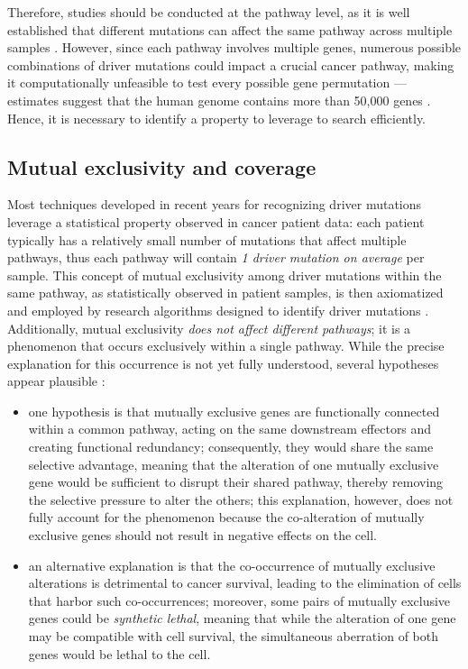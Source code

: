 Therefore, studies should be conducted at the pathway level, as it is well established that different mutations can affect the same pathway across multiple samples \cite{multi-dendrix}. However, since each pathway involves multiple genes, numerous possible combinations of driver mutations could impact a crucial cancer pathway, making it computationally unfeasible to test every possible gene permutation \cite{dendrix} --- estimates suggest that the human genome contains more than 50,000 genes \cite{n-genes}. Hence, it is necessary to identify a property to leverage to search efficiently.

\subsection{Mutual exclusivity and coverage}

Most techniques developed in recent years for recognizing driver mutations leverage a statistical property observed in cancer patient data: each patient typically has a relatively small number of mutations that affect multiple pathways, thus each pathway will contain \textit{1 driver mutation on average} per sample. This concept of mutual exclusivity among driver mutations within the same pathway, as statistically observed in patient samples, is then axiomatized and employed by research algorithms designed to identify driver mutations \cite{multi-dendrix}. Additionally, mutual exclusivity \textit{does not affect different pathways}; it is a phenomenon that occurs exclusively within a single pathway. While the precise explanation for this occurrence is not yet fully understood, several hypotheses appear plausible \cite{survey, mutual_exclusivity_expls, dendrix}:

\begin{itemize}
    \item one hypothesis is that mutually exclusive genes are functionally connected within a common pathway, acting on the same downstream effectors and creating functional redundancy; consequently, they would share the same selective advantage, meaning that the alteration of one mutually exclusive gene would be sufficient to disrupt their shared pathway, thereby removing the selective pressure to alter the others; this explanation, however, does not fully account for the phenomenon because the co-alteration of mutually exclusive genes should not result in negative effects on the cell.
    \item an alternative explanation is that the co-occurrence of mutually exclusive alterations is detrimental to cancer survival, leading to the elimination of cells that harbor such co-occurrences; moreover, some pairs of mutually exclusive genes could be \textit{synthetic lethal}, meaning that while the alteration of one gene may be compatible with cell survival, the simultaneous aberration of both genes would be lethal to the cell.
\end{itemize}

